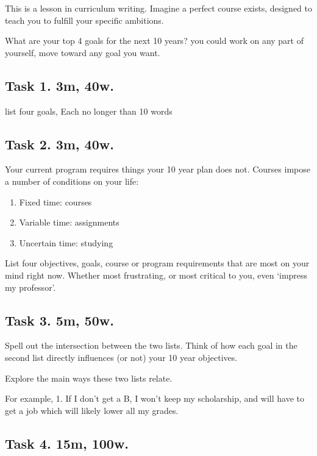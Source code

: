 \documentclass[
]{book}
\providecommand{\tightlist}{%
  \setlength{\itemsep}{0pt}\setlength{\parskip}{0pt}}
\begin{document}
This is a lesson in curriculum writing.
Imagine a perfect course exists,
designed to teach you
to fulfill your specific ambitions.

What are your top 4 goals for
the next 10 years?
you could work on any part of yourself,
move toward any goal you want.

\subsection{\texorpdfstring{\textbf{Task 1. 3m, 40w.}}{Task 1. 3m, 40w.}}\label{task-1.-3m-40w.}

list four goals,
Each no longer than 10 words

\subsection{\texorpdfstring{\textbf{Task 2. 3m, 40w.}}{Task 2. 3m, 40w.}}\label{task-2.-3m-40w.}

Your current program requires things your 10 year plan does not.
Courses impose a number of
conditions on your life:

\begin{enumerate}
\def\labelenumi{\arabic{enumi}.}
\tightlist
\item
  Fixed time: courses
\item
  Variable time: assignments
\item
  Uncertain time: studying
\end{enumerate}

List four objectives, goals, course or program requirements that are
most on your mind right now.
Whether most frustrating, or most critical
to you, even `impress my professor'.

\subsection{\texorpdfstring{\textbf{Task 3. 5m, 50w.}}{Task 3. 5m, 50w.}}\label{task-3.-5m-50w.}

Spell out the intersection between the two lists.
Think of how each goal in the second list
directly influences (or not) your 10 year
objectives.

Explore the main ways these two lists relate.

For example,
1. If I don't get a B, I won't keep my scholarship, and will have to
get a job which will likely lower all my grades.

\subsection{\texorpdfstring{\textbf{Task 4. 15m, 100w.}}{Task 4. 15m, 100w.}}\label{task-4.-15m-100w.}
\end{document}
